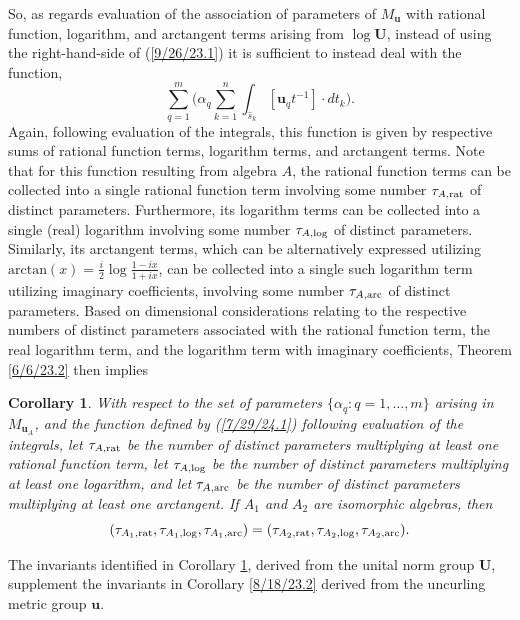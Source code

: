\documentclass{amsart}
\numberwithin{equation}{section}
\newtheorem{corollary}[theorem]{Corollary}
\theoremstyle{definition}
\numberwithin{theorem}{section}
\begin{document}
So, as regards evaluation of the association of parameters of $M_{\mathbf{u}}$ with rational function, logarithm, and arctangent terms arising from $\log\mathbf{U}$, instead of using the right-hand-side of (\ref{9/26/23.1}) it is sufficient to instead deal with the function,
\begin{equation}\label{7/29/24.1} \sum_{q=1}^m \big(\alpha_q\sum_{k=1}^n \int_{\hat{s}_k} [\mathbf{u}_q t^{-1}]\cdot dt_k\big).\end{equation} Again, following evaluation of the integrals, this function is given by respective sums of rational function terms, logarithm terms, and arctangent terms.  Note that for this function resulting from algebra $A$, the rational function terms can be collected into a single rational function term involving some number $\tau_{A,{\rm rat}}$ of distinct parameters.  Furthermore, its logarithm terms can be collected into a single (real) logarithm involving some number $\tau_{A,{\rm log}}$ of distinct parameters.  Similarly, its arctangent terms, which can be alternatively expressed utilizing $\text{arctan}(x) = \frac{i}{2}\log\frac{1-ix}{1+ix}$, can be collected into a single such logarithm term utilizing imaginary coefficients, involving some number $\tau_{A,{\rm arc}}$ of distinct parameters. 
Based on dimensional considerations relating to the respective numbers of distinct parameters associated with the rational function term, the real logarithm term, and the logarithm term with imaginary coefficients, Theorem \ref{6/6/23.2} then implies \enlargethispage{1cm,}

\begin{corollary}\label{7/25/24.1} With respect to the set of parameters $\{\alpha_q:q=1,\dots,m\}$ arising in $M_{\mathbf{u}_A}$, and the function defined by (\ref{7/29/24.1}) following evaluation of the integrals, let $\tau_{A,{\rm rat}}$ be the number of distinct parameters multiplying at least one rational function term, let $\tau_{A,{\rm log}}$ be the number of distinct parameters multiplying at least one logarithm, and let $\tau_{A,{\rm arc}}$ be the number of distinct parameters multiplying at least one arctangent.  If $A_1$ and $A_2$ are isomorphic algebras, then \[ (\tau_{A_1,{\rm rat}},\tau_{A_1,{\rm log}},\tau_{A_1,{\rm arc}}) = (\tau_{A_2,{\rm rat}},\tau_{A_2,{\rm log}},\tau_{A_2,{\rm arc}}).\]
\end{corollary}

The invariants identified in Corollary \ref{7/25/24.1}, derived from the unital norm group $\mathbf{U}$, supplement the invariants in Corollary \ref{8/18/23.2} derived from the uncurling metric group $\mathbf{u}$.
\end{document}
